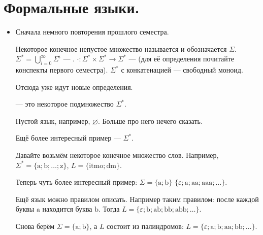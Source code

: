 \documentclass{article}
\begin{document}
    \section{Формальные языки.}
    \begin{itemize}
        \item[]
        \begin{Comment}
            Сначала немного повторения прошлого семестра.
        \end{Comment}
        \dfn Некоторое конечное непустое множество называется  и обозначается $\Sigma$.
        \dfn $\Sigma^*=\bigcup\limits_{i=0}^\infty\Sigma^i$ --- .
        \dfn $\cdot\colon\Sigma^*\times\Sigma^*\to\Sigma^*$ ---  (для её определения почитайте конспекты первого семестра).
        \thm $\Sigma^*$ с конкатенацией --- свободный моноид.
        \begin{Comment}
            Отсюда уже идут новые определения.
        \end{Comment}
        \dfn {} --- это некоторое подмножество $\Sigma^*$.
        \begin{Example}
            Пустой язык, например, $\varnothing$. Больше про него нечего сказать.
        \end{Example}
        \begin{Example}
            Ещё более интересный пример --- $\Sigma^*$.
        \end{Example}
        \begin{Example}
            Давайте возьмём некоторое конечное множество слов. Например, $\Sigma^*=\{\mathrm a;\mathrm b;\ldots;\mathrm z\}$, $L=\{\mathrm{itmo};\mathrm{dm}\}$.
        \end{Example}
        \begin{Example}
            Теперь чуть более интересный пример: $\Sigma=\{\mathrm a;\mathrm b\}$ $\{\varepsilon;\mathrm a;\mathrm{aa};\mathrm{aaa};\ldots\}$.
        \end{Example}
        \begin{Example}
            Ещё язык можно правилом описать. Например таким правилом: после каждой буквы $\mathrm a$ находится буква $\mathrm b$. Тогда $L=\{\varepsilon;\mathrm b;\mathrm{ab};\mathrm{bb};\mathrm{abb};\ldots\}$.
        \end{Example}
        \begin{Example}
            Снова берём $\Sigma=\{\mathrm a;\mathrm b\}$, а $L$ состоит из палиндромов: $L=\{\varepsilon;\mathrm a;\mathrm b;\mathrm{aa};\mathrm{bb};\ldots\}$.

\end{Example}
\end{itemize}
\end{document}
